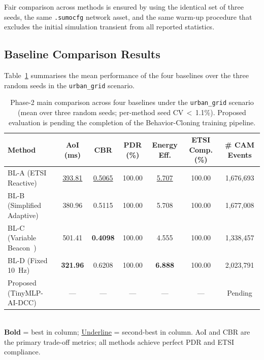 \documentclass[journal]{IEEEtran}
\begin{document}
\noindent
Fair comparison across methods is ensured by using the identical set
of three seeds, the same \texttt{.sumocfg} network asset, and the
same warm-up procedure that excludes the initial simulation transient
from all reported statistics.

\subsection{Baseline Comparison Results}
\label{sec.s_baseline}

Table~\ref{tab:baseline_main} summarises the mean performance of
the four baselines over the three random seeds in the
\texttt{urban\_grid} scenario.

\begin{table}[!t]
  \centering
  \caption{Phase-2 main comparison across four baselines under the
    \texttt{urban\_grid} scenario (mean over three random seeds;
    per-method seed CV\,$<$\,1.1\%). Proposed evaluation is pending
    the completion of the Behavior-Cloning training pipeline.}
  \label{tab:baseline_main}
  \renewcommand{\arraystretch}{1.25}
  \begin{tabular}{lcccccc}
    \toprule
    \textbf{Method}
      & \textbf{AoI (ms)}
      & \textbf{CBR}
      & \textbf{PDR (\%)}
      & \textbf{Energy Eff.}
      & \textbf{ETSI Comp. (\%)}
      & \textbf{\# CAM Events} \\
    \midrule
    BL-A (ETSI Reactive)
      & \underline{393.81}
      & \underline{0.5065}
      & 100.00
      & \underline{5.707}
      & 100.00
      & 1{,}676{,}693 \\
    BL-B (Simplified Adaptive)
      & 380.96
      & 0.5115
      & 100.00
      & 5.708
      & 100.00
      & 1{,}677{,}008 \\
    BL-C (Variable Beacon~\cite{Bhattacharyya2024})
      & 501.41
      & \textbf{0.4098}
      & 100.00
      & 4.555
      & 100.00
      & 1{,}338{,}457 \\
    BL-D (Fixed 10~Hz)
      & \textbf{321.96}
      & 0.6208
      & 100.00
      & \textbf{6.888}
      & 100.00
      & 2{,}023{,}791 \\
    \midrule
    Proposed (TinyMLP-AI-DCC)
      & \multicolumn{1}{c}{---}
      & \multicolumn{1}{c}{---}
      & \multicolumn{1}{c}{---}
      & \multicolumn{1}{c}{---}
      & \multicolumn{1}{c}{---}
      & \multicolumn{1}{c}{Pending} \\
    \bottomrule
  \end{tabular}
  \smallskip\\
  \small \textbf{Bold} = best in column; \underline{Underline} = second-best in column.
  AoI and CBR are the primary trade-off metrics; all methods achieve perfect PDR and ETSI compliance.
\end{table}
\end{document}
